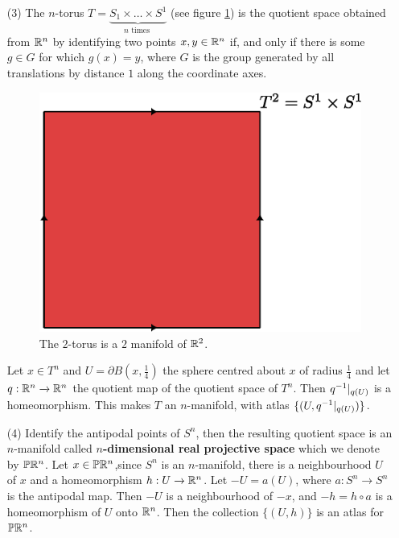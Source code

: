 \begin{example}
\begin{enumerate}
             \item[(3)] The $n$-torus  $T=\underbrace{S_1 \times \dots \times
                 S^1}_{n \text{ times }}$ (see figure \ref{fig_1.2}) is the quotient
                 space obtained from $\mathbb{R}^n$ by identifying two points  $x,y \in \mathbb{R}^n$
                 if, and only if there is some $g \in G$ for which $g(x)=y$,
                 where $G$ is the group generated by all translations by distance
                 $1$ along the coordinate axes.
                 \begin{figure}[h]
                     \centering
                     \includegraphics[scale=0.5]{Figures/Chapter1/2_torus.eps}
                     \caption{The $2$-torus is a  $2$ manifold of  $\mathbb{R}^2$.}
                     \label{fig_1.2}
                 \end{figure}
                 Let $x \in T^n$ and  $U=\partial{B(x,\frac{1}{4})}$ the
                 sphere centred about $x$ of radius $\frac{1}{4}$ and let
                 $q:\mathbb{R}^n \xrightarrow{} \mathbb{R}^n$ the quotient map of the quotient
                 space of $T^n$. Then  $q^{-1}|_{q(U)}$ is a homeomorphism.
                 This makes $T$ an  $n$-manifold, with atlas
                 $\{(U,q^{-1}|_{q(U)})\}$.

             \item[(4)] Identify the antipodal points of $S^n$, then the
                 resulting quotient space is an $n$-manifold called
                 \textbf{$n$-dimensional real projective space} which we denote
                 by $\mathbb{P}\mathbb{R}^n$. Let $x \in \mathbb{P}\mathbb{R}^n$,since $S^n$ is an  $n$-manifold,
                 there is a neighbourhood  $U$ of  $x$ and a homeomorphism $h:U
                 \xrightarrow{} \mathbb{R}^n$. Let $-U=a(U)$, where $a:S^n \xrightarrow{}
                 S^n$ is the antipodal map. Then $-U$ is a neighbourhood of
                 $-x$, and  $-h=h \circ a$ is a homeomorphism of  $U$ onto
                 $\mathbb{R}^n$. Then the collection  $\{(U,h)\}$ is an atlas for
                 $\mathbb{P}\mathbb{R}^n$.


\end{enumerate}
\end{example}
